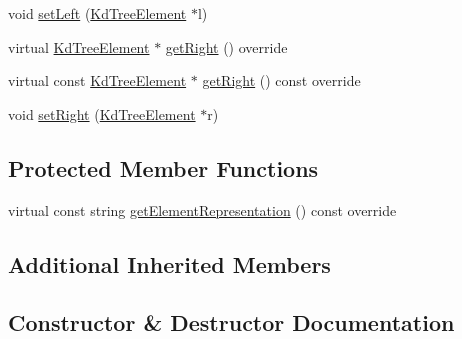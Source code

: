 \begin{DoxyCompactItemize}
\item 
void \hyperlink{classbridges_1_1datastructure_1_1_kd_tree_element_a2ca1571186e00b69f73f324bc4c20753}{set\+Left} (\hyperlink{classbridges_1_1datastructure_1_1_kd_tree_element}{Kd\+Tree\+Element} $\ast$l)
\item 
virtual \hyperlink{classbridges_1_1datastructure_1_1_kd_tree_element}{Kd\+Tree\+Element} $\ast$ \hyperlink{classbridges_1_1datastructure_1_1_kd_tree_element_a366e3b0987169220d3a145043be2373d}{get\+Right} () override
\item 
virtual const \hyperlink{classbridges_1_1datastructure_1_1_kd_tree_element}{Kd\+Tree\+Element} $\ast$ \hyperlink{classbridges_1_1datastructure_1_1_kd_tree_element_ae8d6007d3848b72cbfc11d2e29120781}{get\+Right} () const override
\item 
void \hyperlink{classbridges_1_1datastructure_1_1_kd_tree_element_aee269fced2901e0cb580f998457176ca}{set\+Right} (\hyperlink{classbridges_1_1datastructure_1_1_kd_tree_element}{Kd\+Tree\+Element} $\ast$r)
\end{DoxyCompactItemize}
\subsection*{Protected Member Functions}
\begin{DoxyCompactItemize}
\item 
virtual const string \hyperlink{classbridges_1_1datastructure_1_1_kd_tree_element_a5413ecaf152e3df5fb45dd85da812888}{get\+Element\+Representation} () const override
\end{DoxyCompactItemize}
\subsection*{Additional Inherited Members}


\subsection{Constructor \& Destructor Documentation}
\mbox{\label{classbridges_1_1datastructure_1_1_kd_tree_element_a5dd9f121e73a5c0643dfb52401472297}} 
